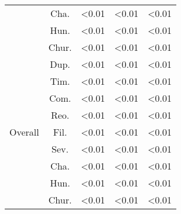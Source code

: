 \begin{table}[]
\begin{tabular}{ccccc}
          & Cha.   & \textless0.01         & \textless0.01         & \textless0.01         \\
          & Hun.   & \textless0.01         & \textless0.01         & \textless0.01         \\
          & Chur.  & \textless0.01         & \textless0.01         & \textless0.01         \\ \rowcolor{gray!25}
          & Dup.   & \textless0.01         & \textless0.01         & \textless0.01         \\ \rowcolor{gray!25}
          & Tim.   & \textless0.01         & \textless0.01         & \textless0.01         \\ \rowcolor{gray!25}
          & Com.   & \textless0.01         & \textless0.01         & \textless0.01         \\ \rowcolor{gray!25}
          & Reo.   & \textless0.01         & \textless0.01         & \textless0.01         \\ \rowcolor{gray!25}
Overall   & Fil.   & \textless0.01         & \textless0.01         & \textless0.01         \\ \rowcolor{gray!25}
          & Sev.   & \textless0.01         & \textless0.01         & \textless0.01         \\ \rowcolor{gray!25}
          & Cha.   & \textless0.01         & \textless0.01         & \textless0.01         \\ \rowcolor{gray!25}
          & Hun.   & \textless0.01         & \textless0.01         & \textless0.01         \\ \rowcolor{gray!25}
          & Chur.  & \textless0.01         & \textless0.01         & \textless0.01
\end{tabular}
\end{table}
